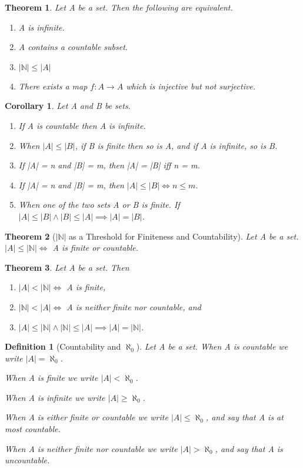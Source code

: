 \documentclass[11pt, oneside]{book}
\theoremstyle{break}
\newtheorem{thm}{Theorem}[section]
\newtheorem{crly}{Corollary}[thm]
\newtheorem{defn}{Definition}[section]
\newcommand{\bb}[1]{\mathbb{#1}}		%
\begin{document}
\begin{thm}
	Let A be a set. Then the following are equivalent.
	\begin{enumerate}
		\item A is infinite.
		\item A contains a countable subset.
		\item $|\bb{N}| \leq |A|$
		\item There exists a map $f: A \to A$ which is injective but not surjective.
	\end{enumerate}
\end{thm}

\begin{crly}
	Let A and B be sets.
	\begin{enumerate}
		\item If A is countable then A is infinite.
		\item When $|A| \leq |B|$, if B is finite then so is A, and if A is infinite, so is B.
		\item If |A| = n and |B| = m, then |A| = |B| iff n = m.
		\item If |A| = n and |B| = m, then $|A| \leq |B| \iff n \leq m$.
		\item When one of the two sets A or B is finite. If $|A| \leq |B| \land |B| \leq |A| \implies |A| = |B|$.
	\end{enumerate}
\end{crly}

\begin{thm}[$|\bb{N}|$ as a Threshold for Finiteness and Countability]
	Let A be a set. $|A| \leq |\bb{N}| \iff$ A is finite or countable.
\end{thm}

\begin{thm}
	Let A be a set. Then
	\begin{enumerate}
		\item $|A| < |\bb{N}| \iff$ A is finite,
		\item $|\bb{N}| < |A| \iff$ A is neither finite nor countable, and
		\item $|A| \leq |\bb{N}| \land |\bb{N}| \leq |A| \implies |A| = |\bb{N}|$.
	\end{enumerate}
\end{thm}

\begin{defn}[Countability and $\aleph_0$]
	Let A be a set. When A is countable we write $|A| = \aleph_0$.

	When A is finite we write $|A| < \aleph_0$.

	When A is infinite we write $|A| \geq \aleph_0$.

	When A is either finite or countable we write $|A| \leq \aleph_0$, and say that A is at most countable.

	When A is neither finite nor countable we write $|A| > \aleph_0$, and say that A is uncountable.
\end{defn}
\end{document}
